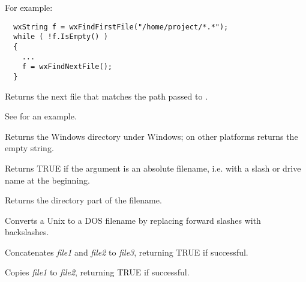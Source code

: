 For example:

\begin{verbatim}
  wxString f = wxFindFirstFile("/home/project/*.*");
  while ( !f.IsEmpty() )
  {
    ...
    f = wxFindNextFile();
  }
\end{verbatim}

\label{wxfindnextfile}


Returns the next file that matches the path passed to .

See  for an example.

\label{wxgetosdirectory}


Returns the Windows directory under Windows; on other platforms returns the empty string.



Returns TRUE if the argument is an absolute filename, i.e. with a slash
or drive name at the beginning.



Returns the directory part of the filename.



Converts a Unix to a DOS filename by replacing forward
slashes with backslashes.



Concatenates {\it file1} and {\it file2} to {\it file3}, returning
TRUE if successful.



Copies {\it file1} to {\it file2}, returning TRUE if successful.

